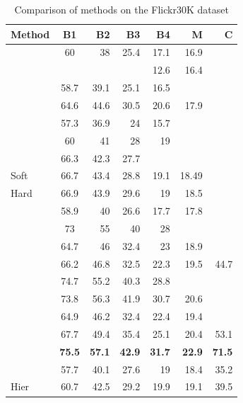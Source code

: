 \clearpage
\begin{table}[ht]
\caption{Comparison of methods on the Flickr30K dataset}
\begin{tabular}{lcrrrrr}
    \toprule
    Method    &    B1    &    B2    &    B3    &    B4    &    M    &    C    \\
    \midrule
    \citet{Kiros2014_LBL}    &    60    &    38    &    25.4    &    17.1    &    16.9    &        \\
    \citet{Chen2015}    &        &        &        &    12.6    &    16.4    &        \\
    \citet{Donahue2015}    &    58.7    &    39.1    &    25.1    &    16.5    &        &        \\
    \citet{Jia2015}    &    64.6    &    44.6    &    30.5    &    20.6    &    17.9    &        \\
    \citet{Karpathy2015}    &    57.3    &    36.9    &    24    &    15.7    &        &        \\
    \citet{Mao2015_mRNN}    &    60    &    41    &    28    &    19    &        &        \\
    \citet{Vinyals2015}    &    66.3    &    42.3    &    27.7    &        &        &        \\
    \citet{Xu2015} Soft    &    66.7    &    43.4    &    28.8    &    19.1    &    18.49    &        \\
    \citet{Xu2015} Hard    &    66.9    &    43.9    &    29.6    &    19    &    18.5    &        \\
    \citet{Oruganti2016}    &    58.9    &    40    &    26.6    &    17.7    &    17.8    &        \\
    \citet{Wu2016}    &    73    &    55    &    40    &    28    &        &        \\
    \citet{You2016}    &    64.7    &    46    &    32.4    &    23    &    18.9    &        \\
    \citet{Chen2017_SCA}    &    66.2    &    46.8    &    32.5    &    22.3    &    19.5    &    44.7    \\
    \citet{Gan2017_SCN}    &    74.7    &    55.2    &    40.3    &    28.8    &        &        \\
    \citet{Gu2017}    &    73.8    &    56.3    &    41.9    &    30.7    &    20.6    &        \\
    \citet{Fu2017}    &    64.9    &    46.2    &    32.4    &    22.4    &    19.4    &        \\
    \citet{Lu2017}    &    67.7    &    49.4    &    35.4    &    25.1    &    20.4    &    53.1    \\
    \citet{Li2018_VS-LSTM}    &    \textbf{75.5}    &    \textbf{57.1}    &    \textbf{42.9}    &    \textbf{31.7}    &    \textbf{22.9}    &    \textbf{71.5}    \\
    \citet{Wang2018}     &    57.7    &    40.1    &    27.6    &    19    &    18.4    &    35.2    \\
    \citet{Wang2018} Hier    &    60.7    &    42.5    &    29.2    &    19.9    &    19.1    &    39.5    \\
    \bottomrule
\end{tabular}
\label{tab:benchmarks_flickr30k}
\end{table}

